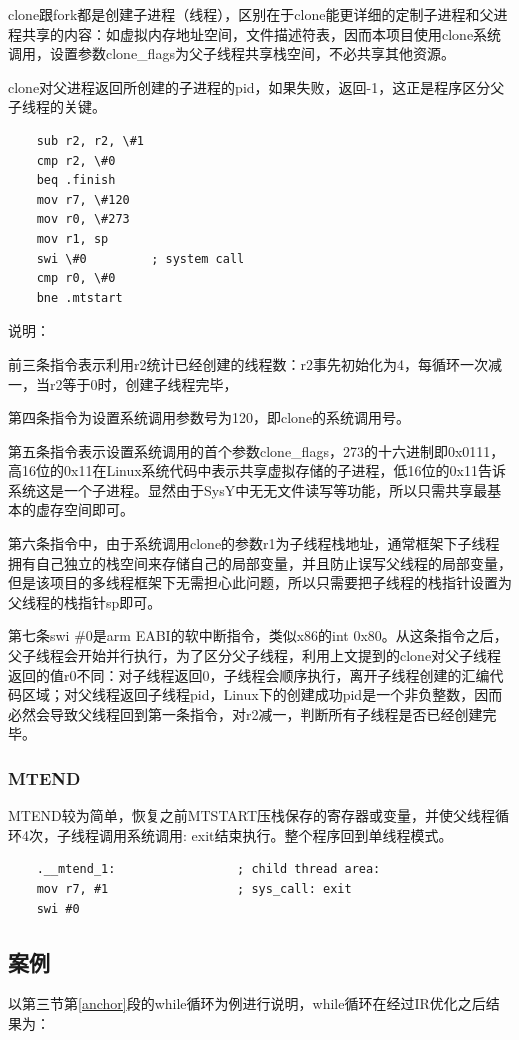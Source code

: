 clone跟fork都是创建子进程（线程），区别在于clone能更详细的定制子进程和父进程共享的内容：如虚拟内存地址空间，文件描述符表，因而本项目使用clone系统调用，设置参数clone\_flags为父子线程共享栈空间，不必共享其他资源。

clone对父进程返回所创建的子进程的pid，如果失败，返回-1，这正是程序区分父子线程的关键。

\begin{verbatim}
    sub r2, r2, \#1     
    cmp r2, \#0         
    beq .finish			
    mov r7, \#120	    
    mov r0, \#273	    
    mov r1, sp	        
    swi \#0         ; system call
    cmp r0, \#0		    
    bne .mtstart
\end{verbatim}

说明：

前三条指令表示利用r2统计已经创建的线程数：r2事先初始化为4，每循环一次减一，当r2等于0时，创建子线程完毕，

第四条指令为设置系统调用参数号为120，即clone的系统调用号。

第五条指令表示设置系统调用的首个参数clone\_flags，273的十六进制即0x0111，高16位的0x11在Linux系统代码中表示共享虚拟存储的子进程，低16位的0x11告诉系统这是一个子进程。显然由于SysY中无无文件读写等功能，所以只需共享最基本的虚存空间即可。
    
第六条指令中，由于系统调用clone的参数r1为子线程栈地址，通常框架下子线程拥有自己独立的栈空间来存储自己的局部变量，并且防止误写父线程的局部变量，但是该项目的多线程框架下无需担心此问题，所以只需要把子线程的栈指针设置为父线程的栈指针sp即可。

第七条swi \#0是arm EABI的软中断指令，类似x86的int 0x80。从这条指令之后，父子线程会开始并行执行，为了区分父子线程，利用上文提到的clone对父子线程返回的值r0不同：对子线程返回0，子线程会顺序执行，离开子线程创建的汇编代码区域；对父线程返回子线程pid，Linux下的创建成功pid是一个非负整数，因而必然会导致父线程回到第一条指令，对r2减一，判断所有子线程是否已经创建完毕。

\subsubsection{MTEND}
MTEND较为简单，恢复之前MTSTART压栈保存的寄存器或变量，并使父线程循环4次，子线程调用系统调用: exit结束执行。整个程序回到单线程模式。
\begin{verbatim}
    .__mtend_1:				    ; child thread area:
    mov r7, #1					; sys_call: exit
    swi #0
\end{verbatim}

\subsection{案例}
以第三节第\ref{anchor}段的while循环为例进行说明，while循环在经过IR优化之后结果为：

